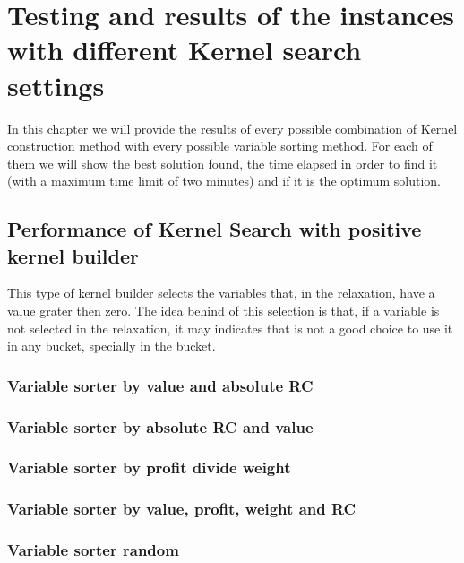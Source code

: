 \chapter{Testing and results of the instances with different Kernel search settings}
In this chapter we will provide the results of every possible combination of Kernel construction method with every possible variable sorting method.
For each of them we will show the best solution found, the time elapsed in order to find it (with a maximum time limit of two minutes) and if it is the optimum solution.
\section{Performance of Kernel Search with positive kernel builder}\label{Instances results positive kernel}
This type of kernel builder selects the variables that, in the relaxation, have a value grater then zero.
The idea behind of this selection is that, if a variable is not selected in the relaxation, it may indicates that is not a good choice to use it in any bucket, specially in the bucket.

\newpage
\subsection{Variable sorter by value and absolute RC}


\newpage
\subsection{Variable sorter by absolute RC and value}


\newpage
\subsection{Variable sorter by profit divide weight}


\newpage
\subsection{Variable sorter by value, profit, weight and RC}


\newpage
\subsection{Variable sorter random}


